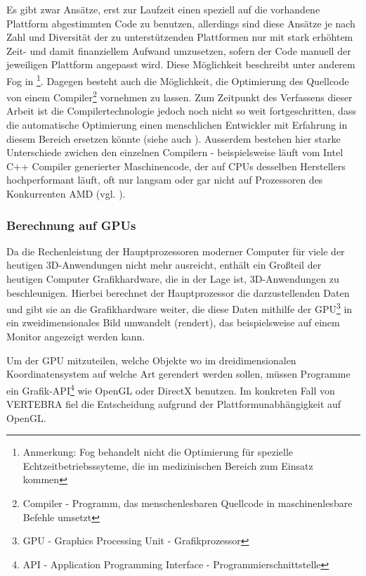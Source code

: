 \documentclass[pdftex,a4paper,titlepage,12pt]{scrartcl}
\newtheorem[L]{boxedDefinition}{Definition}
\begin{document}
Es gibt zwar Ansätze, erst zur Laufzeit einen speziell auf die vorhandene Plattform abgestimmten Code zu benutzen, allerdings sind diese Ansätze je nach Zahl und Diversität der zu unterstützenden Plattformen nur mit stark erhöhtem Zeit- und damit finanziellem Aufwand umzusetzen, sofern der Code manuell der jeweiligen Plattform angepasst wird. Diese Möglichkeit beschreibt unter anderem Fog in \cite{Fog2010}\footnote{Anmerkung: Fog behandelt nicht die Optimierung für spezielle Echtzeitbetriebsssyteme, die im medizinischen Bereich zum Einsatz kommen}. Dagegen besteht auch die Möglichkeit, die Optimierung des Quellcode von einem Compiler\footnote{Compiler - Programm, das menschenlesbaren Quellcode in maschinenlesbare Befehle umsetzt} vornehmen zu lassen. Zum Zeitpunkt des Verfassens dieser Arbeit ist die Compilertechnologie jedoch noch nicht so weit fortgeschritten, dass die automatische Optimierung einen menschlichen Entwickler mit Erfahrung in diesem Bereich ersetzen könnte (siehe auch \cite{Fog2010}). Ausserdem bestehen hier starke Unterschiede zwichen den einzelnen Compilern - beispielsweise läuft vom Intel C++ Compiler generierter Maschinencode, der auf CPUs desselben Herstellers hochperformant läuft, oft nur langsam oder gar nicht auf Prozessoren des Konkurrenten AMD (vgl. \cite[Kapitel 2.5, Seite 10]{Fog2010}).
\subsubsection{Berechnung auf GPUs}\label{sssec:gpucalculation}
Da die Rechenleistung der Hauptprozessoren moderner Computer für viele der heutigen 3D-Anwendungen nicht mehr ausreicht, enthält ein Großteil der heutigen Computer Grafikhardware, die in der Lage ist, 3D-Anwendungen zu beschleunigen. Hierbei berechnet der Hauptprozessor die darzustellenden Daten und gibt sie an die Grafikhardware weiter, die diese Daten mithilfe der GPU\footnote{GPU - Graphics Processing Unit - Grafikprozessor} in ein zweidimensionales Bild umwandelt (rendert), das beispielsweise auf einem Monitor angezeigt werden kann.

Um der GPU mitzuteilen, welche Objekte wo im dreidimensionalen Koordinatensystem auf welche Art gerendert werden sollen, müssen Programme ein Grafik-API\footnote{API - Application Programming Interface - Programmierschnittstelle} wie OpenGL oder DirectX benutzen. Im konkreten Fall von VERTEBRA fiel die Entscheidung aufgrund der Plattformunabhängigkeit auf OpenGL.
\end{document}
